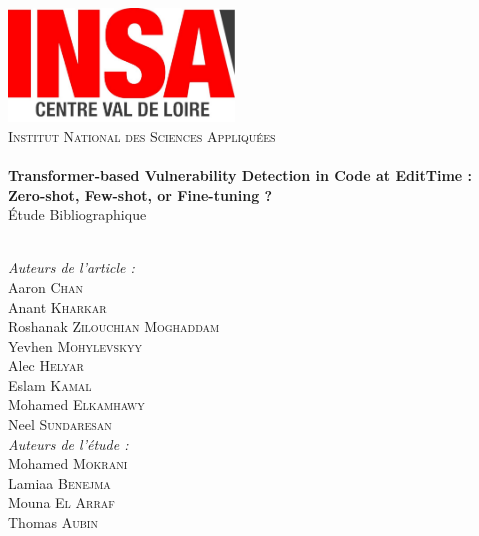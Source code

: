 \begin{titlepage}
    \begin{center}
        \includegraphics[width=0.45\textwidth]{figures/logos/Logo_INSA_CVL}\\[0.9cm]

        \textsc{\LARGE Institut National des Sciences Appliquées}\\[0.35cm]

        \HRule \\[0.4cm]

            {\huge \bfseries Transformer-based Vulnerability Detection in Code at EditTime :}\\[0.30cm]
            {\huge \bfseries Zero-shot, Few-shot, or Fine-tuning ?}\\[0.30cm]
            {\Large Étude Bibliographique}\\[0.30cm]

        \HRule \\[1cm]

        \begin{minipage}{0.4\textwidth}
            \begin{flushleft} \large
                \emph{Auteurs de l'article :}\\
                    Aaron \textsc{Chan}\\
                    Anant \textsc{Kharkar}\\
                    Roshanak \textsc{Zilouchian Moghaddam}\\
                    Yevhen \textsc{Mohylevskyy}\\
                    Alec \textsc{Helyar}\\
                    Eslam \textsc{Kamal}\\
                    Mohamed \textsc{Elkamhawy}\\
                    Neel \textsc{Sundaresan}\\[0.3cm]
                \emph{Auteurs de l'étude :}\\
                    Mohamed \textsc{Mokrani}\\
                    Lamiaa \textsc{Benejma}\\
                    Mouna \textsc{El Arraf}\\
                    Thomas \textsc{Aubin}\\


\end{flushleft}
\end{minipage}
\end{center}
\end{titlepage}
